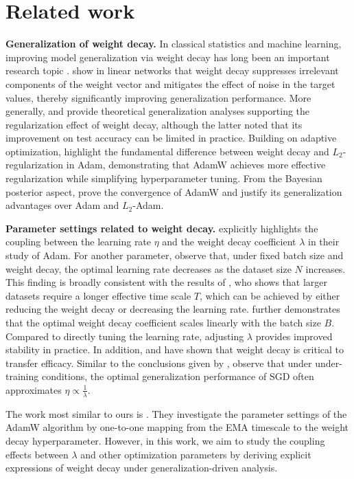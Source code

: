 \section{Related work} 

\textbf{Generalization of weight decay.} 
In classical statistics and machine learning, improving model generalization via weight decay has long been an important research topic \cite{doi:10.1137/0109031,Hoerl,a92f3c16-7c6e-31d3-b403-82d2b0a469e4}. \citet{10.5555/2986916.2987033} show in linear networks that weight decay suppresses irrelevant components of the weight vector and mitigates the effect of noise in the target values, thereby significantly improving generalization performance. More generally, \citet{ShalevShwartz2014UnderstandingML} and \citet{Zhang2016UnderstandingDL} provide theoretical generalization analyses supporting the regularization effect of weight decay, although the latter noted that its improvement on test accuracy can be limited in practice. Building on adaptive optimization, \citet{Loshchilov2017DecoupledWD} highlight the fundamental difference between weight decay and $L_2$-regularization in Adam, demonstrating that AdamW achieves more effective regularization while simplifying hyperparameter tuning. From the Bayesian posterior aspect, \citet{Zhou2024TowardsUC} prove the convergence of AdamW and justify its generalization advantages over Adam and $L_2$-Adam.

\textbf{Parameter settings related to weight decay.} 
\citet{Loshchilov2017DecoupledWD} explicitly highlights the coupling between the learning rate $\eta$ and the weight decay coefficient $\lambda$ in their study of Adam. For another parameter, \citet{blake2025umupunitscaledmaximalupdate} observe that, under fixed batch size and weight decay, the optimal learning rate decreases as the dataset size $N$ increases. This finding is broadly consistent with the results of \citet{wang2025setadamwsweightdecay}, who shows that larger datasets require a longer effective time scale $T$, which can be achieved by either reducing the weight decay or decreasing the learning rate. \citet{bergsma2025powerlinesscalinglaws} further demonstrates that the optimal weight decay coefficient scales linearly with the batch size $B$. Compared to directly tuning the learning rate, adjusting $\lambda$ provides improved stability in practice. In addition, \citet{fan2025robustlayerwisescalingrules} and \citet{wang2025setadamwsweightdecay} have shown that weight decay is critical to transfer efficacy. Similar to the conclusions given by \citet{wang2025setadamwsweightdecay}, \citet{dangelo2024needweightdecaymodern} observe that under under-training conditions, the optimal generalization performance of SGD often approximates $\eta \propto \frac{1}{\lambda}$. 

The work most similar to ours is \cite{wang2025setadamwsweightdecay}. They investigate the parameter settings of the AdamW algorithm by one-to-one mapping from the EMA timescale to the weight decay hyperparameter. However, in this work, we aim to study the coupling effects between $\lambda$ and other optimization parameters by deriving explicit expressions of weight decay under generalization-driven analysis.

